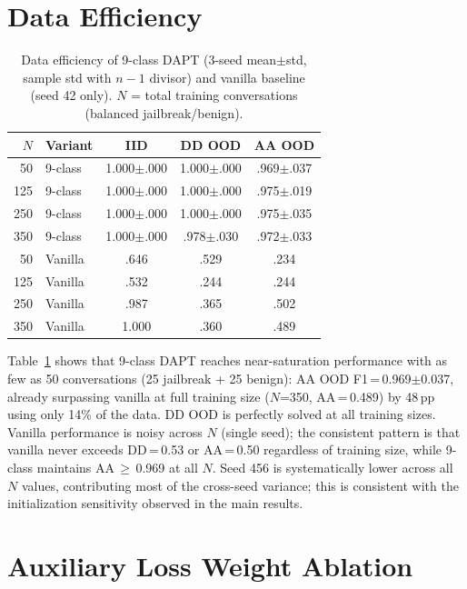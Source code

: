 \section{Data Efficiency}
\label{app:data_efficiency}

\begin{table}[ht]
\centering
\footnotesize
\caption{Data efficiency of 9-class DAPT (3-seed mean$\pm$std, sample std with $n{-}1$ divisor) and vanilla baseline (seed 42 only). $N$ = total training conversations (balanced jailbreak/benign).}
\label{tab:data_efficiency}
\begin{tabular}{@{}rlccc@{}}
\toprule
$N$ & \textbf{Variant} & IID & DD OOD & AA OOD \\
\midrule
50 & 9-class & 1.000$\pm$.000 & 1.000$\pm$.000 & .969$\pm$.037 \\
125 & 9-class & 1.000$\pm$.000 & 1.000$\pm$.000 & .975$\pm$.019 \\
250 & 9-class & 1.000$\pm$.000 & 1.000$\pm$.000 & .975$\pm$.035 \\
350 & 9-class & 1.000$\pm$.000 & .978$\pm$.030 & .972$\pm$.033 \\
\midrule
50 & Vanilla & .646 & .529 & .234 \\
125 & Vanilla & .532 & .244 & .244 \\
250 & Vanilla & .987 & .365 & .502 \\
350 & Vanilla & 1.000 & .360 & .489 \\
\bottomrule
\end{tabular}
\end{table}

Table~\ref{tab:data_efficiency} shows that 9-class DAPT reaches near-saturation performance with as few as 50 conversations (25 jailbreak + 25 benign): AA OOD F1\,=\,0.969$\pm$0.037, already surpassing vanilla at full training size ($N$=350, AA\,=\,0.489) by 48\,pp using only 14\% of the data. DD OOD is perfectly solved at all training sizes. Vanilla performance is noisy across $N$ (single seed); the consistent pattern is that vanilla never exceeds DD\,=\,0.53 or AA\,=\,0.50 regardless of training size, while 9-class maintains AA\,$\geq$\,0.969 at all $N$. Seed 456 is systematically lower across all $N$ values, contributing most of the cross-seed variance; this is consistent with the initialization sensitivity observed in the main results.

\section{Auxiliary Loss Weight Ablation}
\label{app:lambda}

